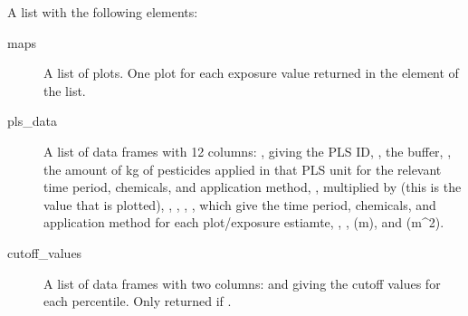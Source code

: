 \documentclass[a4paper]{book}
\begin{document}
%
\begin{Value}
A list with the following elements:
\begin{description}

\item[maps] A list of plots. One plot for each exposure value returned in
the  element of the  list.
\item[pls\_data] A list of data frames with 12 columns: , giving
the PLS ID, , the
buffer, , the amount of kg of pesticides applied in that PLS unit
for the relevant time period, chemicals, and application method,
,  multiplied by  (this is the
value that is plotted), , , ,
, which give the time period, chemicals, and application
method for each plot/exposure estiamte, , ,
 (m), and  (m\textasciicircum{}2).
\item[cutoff\_values] A list of data frames with two columns:  and
 giving the cutoff values for each percentile. Only returned if
.

\end{description}

\end{Value}
%
\end{document}
